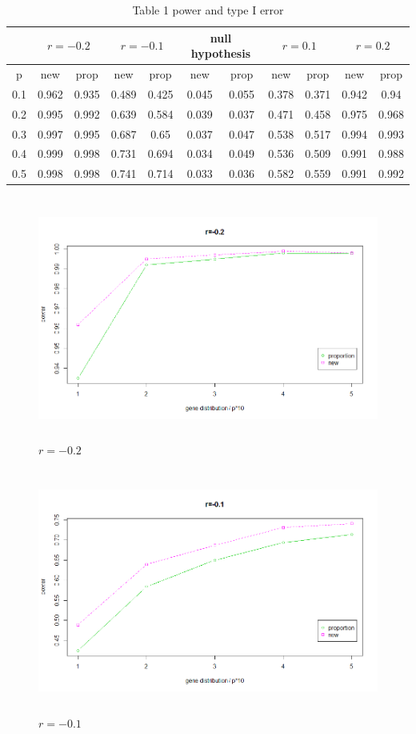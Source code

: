\documentclass[a4,11pt,epsf, amssymb]{article}
\begin{document}
\begin{CJK}{GBK}{song}
\begin{table}[!hbp]
\centering
\caption{Table 1 power and type I error}
\begin{tabular}{|c|c|c|c|c|c|c|c|c|c|c|}
\hline
& \multicolumn{2}{|c|}{$r = -0.2$} & \multicolumn{2}{|c|}{$r = -0.1$} & \multicolumn{2}{|c|}{null hypothesis} &
 \multicolumn{2}{|c|}{$r = 0.1$} & \multicolumn{2}{|c|}{$r = 0.2$} \\
\hline
p & new & prop & new & prop & new & prop & new & prop &
 new & prop \\
\hline
0.1 & 0.962 & 0.935 & 0.489 & 0.425 & 0.045 &
0.055 & 0.378 & 0.371 & 0.942 & 0.94   \\
0.2 & 0.995 & 0.992 & 0.639 & 0.584 & 0.039 &
0.037 & 0.471 & 0.458 & 0.975 & 0.968   \\
0.3 & 0.997 & 0.995 & 0.687 & 0.65 & 0.037 &
0.047 & 0.538 & 0.517 & 0.994 & 0.993   \\
0.4 & 0.999 & 0.998 & 0.731 & 0.694 & 0.034 &
0.049 & 0.536 & 0.509 & 0.991 & 0.988   \\
0.5 & 0.998 & 0.998 & 0.741 & 0.714 & 0.033 &
0.036 & 0.582 & 0.559 & 0.991 & 0.992   \\
\hline
\end{tabular}
\end{table}

\begin{figure}
\centering
\includegraphics[height = 8cm]{r-2.png}
\caption{$r = -0.2$}
\end{figure}

\begin{figure}
\centering
\includegraphics[height = 8cm]{r-1.png}
\caption{$r = -0.1$}
\end{figure}


\end{CJK}
\end{document}
